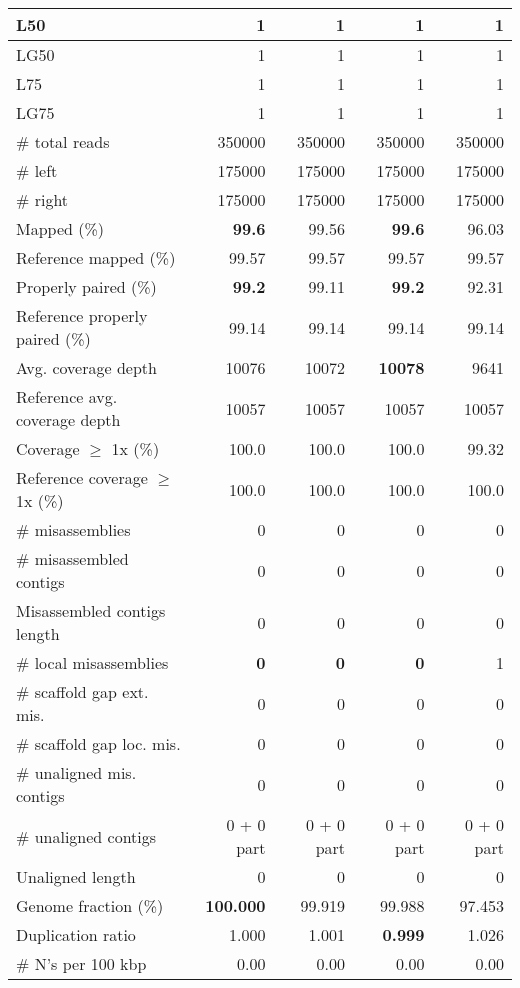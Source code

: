 \documentclass[12pt,a4paper]{article}
\begin{document}
\begin{table}[ht]
\begin{center}
\begin{tabular}{|l*{4}{|r}|}
L50 & 1 & 1 & 1 & 1 \\ \hline
LG50 & 1 & 1 & 1 & 1 \\ \hline
L75 & 1 & 1 & 1 & 1 \\ \hline
LG75 & 1 & 1 & 1 & 1 \\ \hline
\# total reads & 350000 & 350000 & 350000 & 350000 \\ \hline
\# left & 175000 & 175000 & 175000 & 175000 \\ \hline
\# right & 175000 & 175000 & 175000 & 175000 \\ \hline
Mapped (\%) & {\bf 99.6} & 99.56 & {\bf 99.6} & 96.03 \\ \hline
Reference mapped (\%) & 99.57 & 99.57 & 99.57 & 99.57 \\ \hline
Properly paired (\%) & {\bf 99.2} & 99.11 & {\bf 99.2} & 92.31 \\ \hline
Reference properly paired (\%) & 99.14 & 99.14 & 99.14 & 99.14 \\ \hline
Avg. coverage depth & 10076 & 10072 & {\bf 10078} & 9641 \\ \hline
Reference avg. coverage depth & 10057 & 10057 & 10057 & 10057 \\ \hline
Coverage $\geq$ 1x (\%) & 100.0 & 100.0 & 100.0 & 99.32 \\ \hline
Reference coverage $\geq$ 1x (\%) & 100.0 & 100.0 & 100.0 & 100.0 \\ \hline
\# misassemblies & 0 & 0 & 0 & 0 \\ \hline
\# misassembled contigs & 0 & 0 & 0 & 0 \\ \hline
Misassembled contigs length & 0 & 0 & 0 & 0 \\ \hline
\# local misassemblies & {\bf 0} & {\bf 0} & {\bf 0} & 1 \\ \hline
\# scaffold gap ext. mis. & 0 & 0 & 0 & 0 \\ \hline
\# scaffold gap loc. mis. & 0 & 0 & 0 & 0 \\ \hline
\# unaligned mis. contigs & 0 & 0 & 0 & 0 \\ \hline
\# unaligned contigs & 0 + 0 part & 0 + 0 part & 0 + 0 part & 0 + 0 part \\ \hline
Unaligned length & 0 & 0 & 0 & 0 \\ \hline
Genome fraction (\%) & {\bf 100.000} & 99.919 & 99.988 & 97.453 \\ \hline
Duplication ratio & 1.000 & 1.001 & {\bf 0.999} & 1.026 \\ \hline
\# N's per 100 kbp & 0.00 & 0.00 & 0.00 & 0.00 \\ \hline

\end{tabular}
\end{center}
\end{table}
\end{document}
